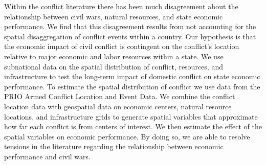 


Within the conflict literature there has been much disagreement about the relationship between civil wars, natural resources, and state economic performance. We find that this disagreement results from not accounting for the spatial disaggregation of conflict events within a country. Our hypothesis is that the economic impact of civil conflict is contingent on the conflict's location relative to major economic and labor resources within a state. We use subnational data on the spatial distribution of conflict, resources, and infrastructure to test the long-term impact of domestic conflict on state economic performance. To estimate the spatial distribution of conflict we use data from the PRIO Armed Conflict Location and Event Data. We combine the conflict location data with geospatial data on economic centers, natural resource locations, and infrastructure grids to generate spatial variables that approximate how far each conflict is from centers of interest. We then estimate the effect of the spatial variables on economic performance. By doing so, we are able to resolve tensions in the literature regarding the relationship between economic performance and civil wars. 